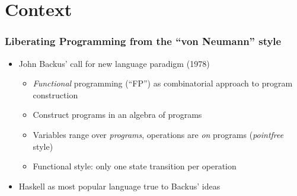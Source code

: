 \section{Context}
\begin{frame}
\frametitle{Liberating Programming from the ``von Neumann'' style}

\begin{itemize}
    \item John Backus' call for new language paradigm (1978)
    \begin{itemize}
        \item \emph{Functional} programming (``FP'') as combinatorial
              approach to program construction
        \item Construct programs in an algebra of programs
        \item Variables range over \emph{programs}, operations are \emph{on}
              programs (\emph{pointfree} style)
        \item Functional style: only one state transition per operation
    \end{itemize}
    \item Haskell as most popular language true to Backus' ideas
\end{itemize}
\end{frame}

